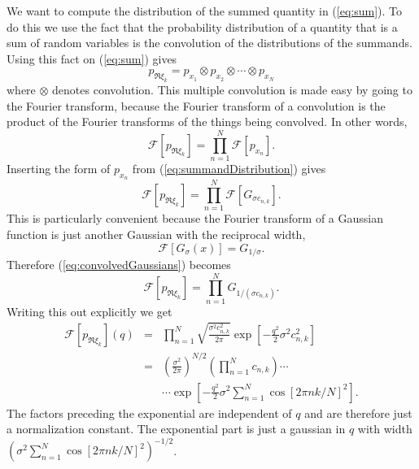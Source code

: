 We want to compute the distribution of the summed quantity in (\ref{eq:sum}).
To do this we use the fact that the probability distribution of a quantity that is a sum of random variables is the convolution of the distributions of the summands.
Using this fact on (\ref{eq:sum}) gives\begin{equation}
p_{\Re\xi_{k}}=p_{x_{1}}\otimes p_{x_{2}}\otimes\cdots\otimes p_{x_{N}}\label{eq:convolution}\end{equation}
where $\otimes$ denotes convolution.
This multiple convolution is made easy by going to the Fourier transform, because the Fourier transform of a convolution is the product of the Fourier transforms of the things being convolved.
In other words,\begin{equation}
\mathcal{F}\left[p_{\Re\xi_{k}}\right]=\prod_{n=1}^{N}\mathcal{F}\left[p_{x_{n}}\right] . \label{eq:convolutionProduct} \end{equation}
Inserting the form of $p_{x_{n}}$ from (\ref{eq:summandDistribution}) gives\begin{equation}
\mathcal{F}\left[p_{\Re\xi_{k}}\right]=\prod_{n=1}^{N}\mathcal{F}\left[G_{\sigma c_{n,k}}\right] . \label{eq:convolvedGaussians}\end{equation}
This is particularly convenient because the Fourier transform of a Gaussian function is just another Gaussian with the reciprocal width,\begin{displaymath}
\mathcal{F}\left[G_{\sigma}(x)\right] = G_{1/\sigma} . \end{displaymath}
Therefore (\ref{eq:convolvedGaussians}) becomes\begin{equation}
\mathcal{F}\left[p_{\Re\xi_{k}}\right]=\prod_{n=1}^{N}G_{1/(\sigma c_{n,k})} . \end{equation}
Writing this out explicitly we get\begin{eqnarray*}
\mathcal{F}\left[p_{\Re\xi_{k}}\right](q) & = & \prod_{n=1}^{N}\sqrt{\frac{\sigma^{2}c_{n,k}^{2}}{2\pi}}\exp\left[-\frac{q^{2}}{2}\sigma^{2}c_{n,k}^{2}\right]\\
& = & \left(\frac{\sigma^{2}}{2\pi}\right)^{N/2}\left(\prod_{n=1}^{N}c_{n,k}\right)\cdots\\
&  & \cdots\exp\left[-\frac{q^{2}}{2}\sigma^{2}\sum_{n=1}^{N}\cos\left[2\pi nk/N\right]^{2}\right] . \end{eqnarray*}
The factors preceding the exponential are independent of $q$ and are therefore just a normalization constant.
The exponential part is just a gaussian in $q$ with width $\left(\sigma^{2}\sum_{n=1}^{N}\cos\left[2\pi nk/N\right]^{2}\right)^{-1/2}$.
